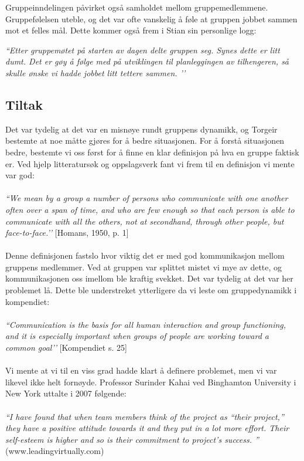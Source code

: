 Gruppeinndelingen påvirket også samholdet mellom gruppemedlemmene. Gruppefølelsen uteble, og det var ofte vanskelig å føle at gruppen jobbet sammen mot et felles mål. Dette kommer også frem i Stian sin personlige logg:\newline

\emph{``Etter gruppemøtet på starten av dagen delte gruppen seg. Synes dette er litt dumt. Det er gøy å følge med på utviklingen til planleggingen av tilhengeren, så skulle ønske vi hadde jobbet litt tettere sammen. ’’}

\subsection{Tiltak}
Det var tydelig at det var en misnøye rundt gruppens dynamikk, og Torgeir bestemte at noe måtte gjøres for å bedre situasjonen. For å forstå situasjonen bedre, bestemte vi oss først for å finne en klar definisjon på hva en gruppe faktisk er. Ved hjelp litteratursøk og oppslagsverk fant vi frem til en definisjon vi mente var god:\\\\
\emph{``We mean by a group a number of persons who communicate with one another often over a span of time, and who are few enough so that each person is able to communicate with all the others, not at secondhand, through other people, but face-to-face.’’} [Homans, 1950, p. 1]\\\\
Denne definisjonen fastslo hvor viktig det er med god kommunikasjon mellom gruppens medlemmer. Ved at gruppen var splittet mistet vi mye av dette, og kommunikasjonen oss imellom ble kraftig svekket. Det var tydelig at det var her problemet lå. Dette ble understreket ytterligere da vi leste om gruppedynamikk i kompendiet:\\\\
\emph{``Communication is the basis for all human interaction and group functioning, and it is especially important when groups of people are working toward a common goal’’} [Kompendiet s. 25]\\\\
Vi mente at vi til en viss grad hadde klart å definere problemet, men vi var likevel ikke helt fornøyde. Professor Surinder Kahai ved Binghamton University i New York uttalte i 2007 følgende:\\\\
\emph{``I have found that when team members think of the project as “their project,” they have a positive attitude towards it and they put in a lot more effort. Their self-esteem is higher and so is their commitment to project’s success. ''} (www.leadingvirtually.com)\newline

